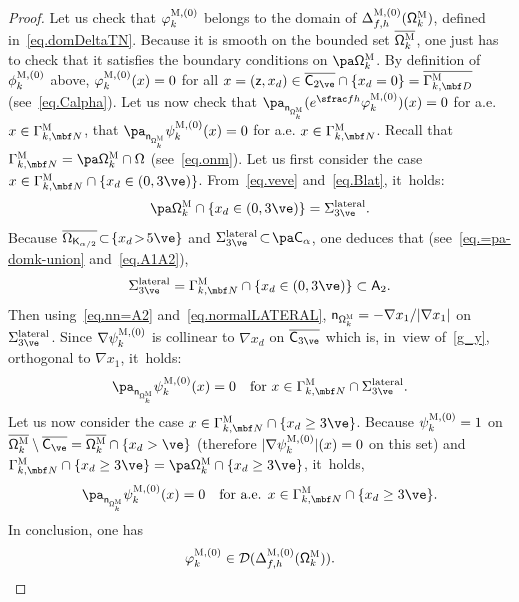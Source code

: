 \begin{proof}
Let us check that $\varphi^{\textsc{M},(0)}_k$ belongs to the domain
of $\Delta_{f,h}^{\textsc{M}, (0)}(\mathsf \Omega_k^{\textsc{M}})$,
defined in~\eqref{eq.domDeltaTN}. Because it is smooth on the bounded set $\overline{\mathsf \Omega_k^{\textsc{M}}}$, one just has to check that it satisfies the boundary conditions on $\pa \mathsf \Omega_k^{\textsc{M}} $. By definition of $\phi^{\textsc{M},(0)}_k$ above, $\varphi^{\textsc{M},(0)}_k(x)=0$ for all $x=(\mathsf z,x_d) \in \overline{ \mathsf C_{2\ve}} \cap \{x_d =0\} = \overline{\Gamma_{k,\mbf D}^{\textsc{M}}}$ (see~\eqref{eq.Calpha}). Let us now check that $\pa _{\mathsf n_{ \mathsf \Omega_k^{\textsc{M}} }}(e^{\sfrac fh} \varphi^{\textsc{M},(0)}_k)(x)=0$ for a.e. $x\in \Gamma_{k,\mbf N}^{\textsc{M}}$, \ie that $\pa _{\mathsf n_{ \mathsf \Omega_k^{\textsc{M}} }}\psi^{\textsc{M},(0)}_k(x)=0$ for a.e. $x\in \Gamma_{k,\mbf N}^{\textsc{M}}$. Recall that $\Gamma_{k,\mbf N}^{\textsc{M}}=\pa \mathsf \Omega_k^{\textsc{M}} \cap \Omega$ (see~\eqref{eq.onm}). Let us first consider the case $x\in \Gamma_{k,\mbf N}^{\textsc{M}}\cap \{x_d\in (0,3\ve)\}$.
From~\eqref{eq.veve} and~\eqref{eq.Blat}, it~holds:
\begin{equation}\label{eq.=Sve}
\pa \mathsf \Omega_k^{\textsc{M}} \cap \{x_d\in (0,3\ve)\} =\Sigma_{3\ve}^{\textup{lateral}}.
\end{equation}
Because $\overline{\Omega_{\mathsf K_{\alpha/2}}} \!\subset\! \{x_d\!>\! 5\ve\}$ and $\Sigma_{3\ve}^{\textup{lateral}} \!\subset\! \pa \mathsf C_\alpha$, one deduces that (see~\eqref{eq.=pa-domk-union} and~\eqref{eq.A1A2}),
\[
\Sigma_{3\ve}^{\textup{lateral}}= \Gamma_{k,\mbf N}^{\textsc{M}}\cap \{x_d\in (0,3\ve)\} \subset \mathsf A_2.
\]
Then using~\eqref{eq.nn=A2} and~\eqref{eq.normalLATERAL}, $\mathsf n_{ \mathsf \Omega_k^{\textsc{M}}}=- {\nabla x_1}/ {\vert \nabla x_1\vert}$ on $\Sigma_{3\ve}^{\textup{lateral}}$. Since $\nabla \psi^{\textsc{M},(0)}_k$ is collinear to $\nabla x_d$ on $\overline{ \mathsf C_{3\ve} }$ which is, in~view of~\eqref{g_y}, orthogonal to $\nabla x_1$, it~holds:
\[
\pa _{\mathsf n_{ \mathsf \Omega_k^{\textsc{M}} }}\psi^{\textsc{M},(0)}_k(x)=0 \quad\text{for } x \in \Gamma_{k,\mbf N}^{\textsc{M}} \cap \Sigma_{3\ve}^{\textup{lateral}}.
\]
Let us now consider the case $x\in \Gamma_{k,\mbf N}^{\textsc{M}}\cap \{x_d\ge 3\ve\}$.
Because $\psi^{\textsc{M},(0)}_k=1$ on $ \overline{\mathsf \Omega_k^{\textsc{M}} }\setminus \overline{\mathsf C_{\ve}}= \overline{\mathsf \Omega_k^{\textsc{M}} }\cap\{x_d>\ve\}$ (therefore $\vert \nabla \psi^{\textsc{M},(0)}_k\vert (x)=0$ on this set) and $\Gamma_{k,\mbf N}^{\textsc{M}}\cap\{x_d\ge 3\ve\}= \pa \mathsf \Omega_k^{\textsc{M}} \cap\{x_d\ge 3\ve\}$, it~holds,
\[
\pa _{\mathsf n_{ \mathsf \Omega_k^{\textsc{M}} }}\psi^{\textsc{M},(0)}_k(x)=0 \quad\text{for a.e. } x\in \Gamma_{k,\mbf N}^{\textsc{M}}\cap\{x_d\ge 3\ve\}.
\]
In conclusion, one has
\begin{equation}\label{eq.psi-DM}
\varphi^{\textsc{M},(0)}_k \in \mathcal D(\Delta_{f,h}^{\textsc{M}, (0)}(\mathsf \Omega_k^{\textsc{M}})).
\end{equation}


\end{proof}
